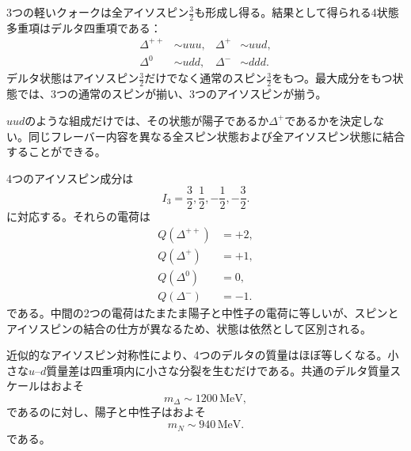 3つの軽いクォークは全アイソスピン\(\tfrac32\)も形成し得る。結果として得られる4状態多重項はデルタ四重項である：
\begin{equation}
\begin{aligned}
\Delta^{++}&\sim uuu,
&
\Delta^{+}&\sim uud,
\\
\Delta^{0}&\sim udd,
&
\Delta^{-}&\sim ddd.
\end{aligned}
\end{equation}
デルタ状態はアイソスピン\(\tfrac32\)だけでなく通常のスピン\(\tfrac32\)をもつ。最大成分をもつ状態では、3つの通常のスピンが揃い、3つのアイソスピンが揃う。

\(uud\)のような組成だけでは、その状態が陽子であるか\(\Delta^+\)であるかを決定しない。同じフレーバー内容を異なる全スピン状態および全アイソスピン状態に結合することができる。

\begin{classroomqa}
\end{classroomqa}

\begin{classroomqa}
\end{classroomqa}

4つのアイソスピン成分は
\begin{equation}
I_3=\frac32,\frac12,-\frac12,-\frac32.
\end{equation}
に対応する。それらの電荷は
\begin{align}
Q(\Delta^{++})&=+2,\\
Q(\Delta^{+})&=+1,\\
Q(\Delta^{0})&=0,\\
Q(\Delta^{-})&=-1.
\end{align}
である。中間の2つの電荷はたまたま陽子と中性子の電荷に等しいが、スピンとアイソスピンの結合の仕方が異なるため、状態は依然として区別される。

近似的なアイソスピン対称性により、4つのデルタの質量はほぼ等しくなる。小さな\(u\)--\(d\)質量差は四重項内に小さな分裂を生むだけである。共通のデルタ質量スケールはおよそ
\begin{equation}
m_\Delta\sim1200\,\mathrm{MeV},
\end{equation}
であるのに対し、陽子と中性子はおよそ
\begin{equation}
m_N\sim940\,\mathrm{MeV}.
\end{equation}
である。

